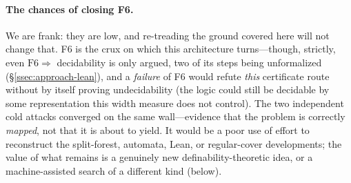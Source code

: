 \documentclass[11pt]{article}
\theoremstyle{plain}
\theoremstyle{definition}
\begin{document}
\paragraph{The chances of closing F6.} We are frank: they are low, and
re-treading the ground covered here will not change that. F6 is the crux on
which this architecture turns---though, strictly, even
$\mathrm{F6}\Rightarrow$ decidability is only argued, two of its steps being
unformalized (\S\ref{ssec:approach-lean}), and a \emph{failure} of
F6 would refute \emph{this} certificate route without by itself proving
undecidability (the logic could still be decidable by some representation
this width measure does not control). The two independent cold attacks
converged on the same wall---evidence that the problem is correctly
\emph{mapped}, not that it is about to yield. It would be a poor use of effort to
reconstruct the split-forest, automata, Lean, or regular-cover
developments; the value of what remains is a genuinely new
definability-theoretic idea, or a machine-assisted search of a different
kind (below).
\end{document}
